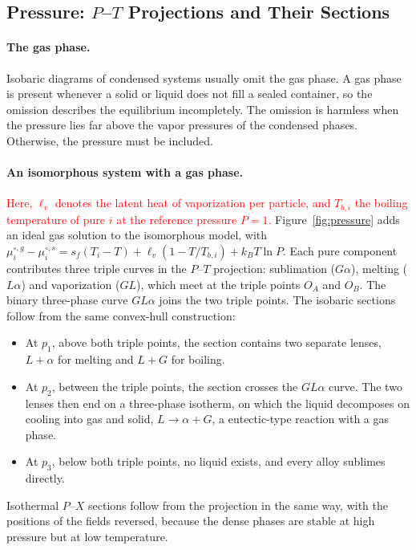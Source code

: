 \subsection{Pressure: $P$--$T$ Projections and Their Sections}
\label{sec:pressure}

\paragraph{The gas phase.}
Isobaric diagrams of condensed systems usually omit the gas phase. A gas
phase is present whenever a solid or liquid does not fill a sealed
container, so the omission describes the equilibrium incompletely. The
omission is harmless when the pressure lies far above the vapor pressures
of the condensed phases. Otherwise, the pressure must be included.

\paragraph{An isomorphous system with a gas phase.}
\textcolor{red}{Here, $\ell_v$ denotes the latent heat of vaporization per
particle, and $T_{b,i}$ the boiling temperature of pure $i$ at the
reference pressure $P=1$.}
Figure~\ref{fig:pressure} adds an ideal gas solution to the isomorphous model,
with $\mu_i^{\circ,g}-\mu_i^{\circ,s}=s_f(T_i-T)+\ell_v(1-T/T_{b,i})+k_BT\ln P$.
Each pure component contributes three triple curves in the $P$--$T$
projection: sublimation ($G\alpha$), melting ($L\alpha$) and vaporization
($GL$), which meet at the triple points $O_A$ and $O_B$. The binary
three-phase curve $GL\alpha$ joins the two triple points. The isobaric
sections follow from the same convex-hull construction:
\begin{itemize}
    \item At $p_1$, above both triple points, the section contains two
    separate lenses, $L+\alpha$ for melting and $L+G$ for boiling.
    \item At $p_2$, between the triple points, the section crosses the
    $GL\alpha$ curve. The two lenses then end on a three-phase isotherm, on
    which the liquid decomposes on cooling into gas and solid, $L\to\alpha+G$,
    a eutectic-type reaction with a gas phase.
    \item At $p_3$, below both triple points, no liquid exists, and every
    alloy sublimes directly.
\end{itemize}
Isothermal $P$--$X$ sections follow from the projection in the same way, with
the positions of the fields reversed, because the dense phases are stable at
high pressure but at low temperature.

